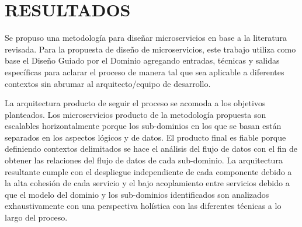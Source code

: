 \section{RESULTADOS}

Se propuso una metodología para diseñar microservicios en base a la literatura revisada.
Para la propuesta de diseño de microservicios, este trabajo utiliza como base el Diseño Guiado por el Dominio
agregando entradas, técnicas y salidas específicas para aclarar el proceso de manera tal que
sea aplicable a diferentes contextos sin abrumar al arquitecto/equipo de desarrollo.

La arquitectura producto de seguir el proceso se acomoda a los objetivos planteados.
Los microservicios producto de la metodología propuesta son escalables horizontalmente porque
los sub-dominios en los que se basan están separados en los aspectos lógicos y de datos.
El producto final es fiable porque definiendo contextos delimitados se hace el análisis del flujo
de datos con el fin de obtener las relaciones del flujo de datos de cada sub-dominio.
La arquitectura resultante cumple con el despliegue independiente de cada componente debido
a la alta cohesión de cada servicio y el bajo acoplamiento entre servicios debido a que el
modelo del dominio y los sub-dominios identificados son analizados exhaustivamente con una
perspectiva holística con las diferentes técnicas a lo largo del proceso.


